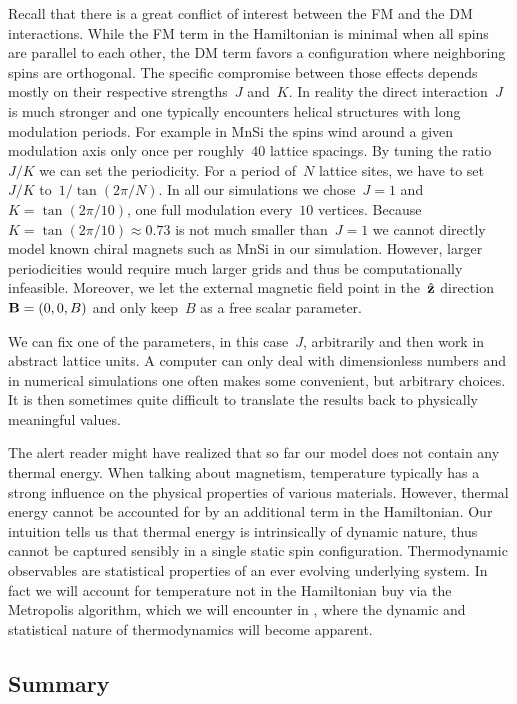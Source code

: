 Recall that there is a great conflict of interest between the FM and the DM
interactions. While the FM term in the Hamiltonian is minimal when all spins are
parallel to each other, the DM term favors a configuration where neighboring
spins are orthogonal. The specific compromise between those effects depends
mostly on their respective strengths~$J$ and~$K$. In reality the direct
interaction~$J$ is much stronger and one typically encounters helical structures
with long modulation periods. For example in MnSi the spins wind around a given
modulation axis only once per roughly~$40$ lattice spacings.  By tuning the
ratio~$J/K$ we can set the periodicity. For a period of~$N$ lattice sites, we
have to set~$J/K$ to~$1/\tan(2\pi / N)$. In all our simulations we chose~$J=1$
and~$K=\tan(2\pi / 10)$, \ie{} one full modulation every~$10$ vertices.
Because~$K=\tan(2\pi / 10)\approx 0.73$ is not much smaller than~$J=1$ we cannot
directly model known chiral magnets such as MnSi in our simulation. However,
larger periodicities would require much larger grids and thus be computationally
infeasible. Moreover, we let the external magnetic field point in the~$\hat{\mathbf{z}}$
direction~$\mathbf{B}=(0,0,B)$ and only keep~$B$ as a free scalar parameter.

We can fix one of the parameters, in this case~$J$, arbitrarily and then work in
abstract lattice units. A computer can only deal with dimensionless numbers and
in numerical simulations one often makes some convenient, but arbitrary choices.
It is then sometimes quite difficult to translate the results back to physically
meaningful values.

The alert reader might have realized that so far our model does not contain any
thermal energy. When talking about magnetism, temperature typically has a strong
influence on the physical properties of various materials. However, thermal
energy cannot be accounted for by an additional term in the Hamiltonian. Our
intuition tells us that thermal energy is intrinsically of dynamic nature, thus
cannot be captured sensibly in a single static spin configuration. Thermodynamic
observables are statistical properties of an ever evolving underlying system. In
fact we will account for temperature not in the Hamiltonian buy via the
Metropolis algorithm, which we will encounter in , where
the dynamic and statistical nature of thermodynamics will become apparent.

\subsection{Summary}


